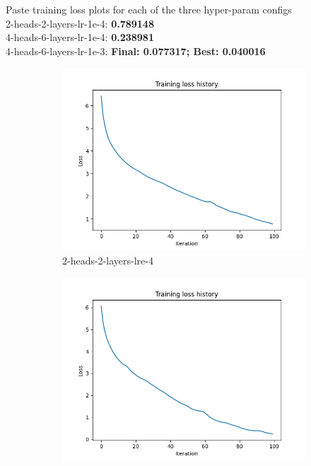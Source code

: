 \documentclass[11pt,addpoints,answers]{exam}
\numberwithin{equation}{section} %
\numberwithin{figure}{section} %
\numberwithin{table}{section} %
\begin{document}
\begin{questions}
\question Paste training loss plots for each of the three hyper-param configs
\\
2-heads-2-layers-lr-1e-4: \textbf{0.789148} \\
4-heads-6-layers-lr-1e-4: \textbf{0.238981} \\
4-heads-6-layers-lr-1e-3: \textbf{Final: 0.077317; Best: 0.040016} 
\begin{figure}[H]
    \centering
    \begin{subfigure}[b]{0.32\linewidth}
        \includegraphics[width=\linewidth]{../transformer_captioning/plots 2/case1_loss_out.png}
        \caption{2-heads-2-layers-lre-4}
    \end{subfigure}
    \begin{subfigure}[b]{0.32\linewidth}
        \includegraphics[width=\linewidth]{../transformer_captioning/plots 2/case2_loss_out.png}

\end{subfigure}
\end{figure}
\end{questions}
\end{document}
